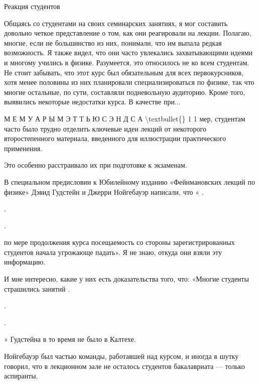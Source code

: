 \documentclass[10pt,oneside]{article}
\begin{document}
Реакция студентов\par

Общаясь со студентами на своих семинарских занятиях, я мог составить довольно четкое представление о том, как они реагировали на лекции. Полагаю, многие, если не большинство из них, понимали, что им выпала редкая возможность. Я также видел, что они часто увлекались захватывающими идеями и многому учились в физике. Разумеется, это относилось не ко всем студентам. Не стоит забывать, что этот курс был обязательным для всех первокурсников, хотя менее половины из них планировали специализироваться по физике, так что многие остальные, по сути, составляли подневольную аудиторию. Кроме того, выявились некоторые недостатки курса. В качестве при...\par

М Е М У А Р Ы  М Э Т Т Ь Ю  С Э Н Д С А \textbackslash{}textbullet\{\} 1 1 мер, студентам часто было трудно отделить ключевые идеи лекций от некоторого второстепенного материала, введенного для иллюстрации практического применения.\par

Это особенно расстраивало их при подготовке к экзаменам.\par

В специальном предисловии к Юбилейному изданию «Фейнмановских лекций по физике» Дэвид Гудстейн и Джерри Нойгебауэр написали, что « .\par

.\par

.\par

по мере продолжения курса посещаемость со стороны зарегистрированных студентов начала угрожающе падать». Я не знаю, откуда они взяли эту информацию.\par

И мне интересно, какие у них есть доказательства того, что: «Многие студенты страшились занятий .\par

.\par

.\par

» Гудстейна в то время не было в Калтехе.\par

Нойгебауэр был частью команды, работавшей над курсом, и иногда в шутку говорил, что в лекционном зале не осталось студентов бакалавриата --- только аспиранты.\par
\end{document}
